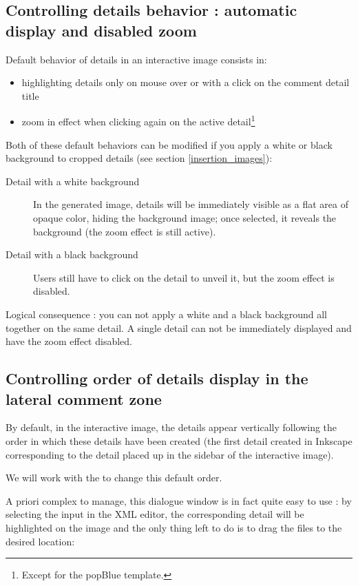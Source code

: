 \subsection{Controlling details behavior : automatic display and disabled zoom}\label{white_black_background}

Default behavior of details in an interactive image consists in:
\begin{itemize}
 \item highlighting details only on mouse over or with a click on the comment 
 detail title
 \item zoom in effect when clicking again on the active detail\footnote{Except 
 for the popBlue template.}
\end{itemize}

Both of these default behaviors can be modified if you apply a white
 or black background to cropped details (see section 
\ref{insertion_images}):
\begin{description}
 \item [Detail with a white background] In the generated image, details will be
 immediately visible as a flat area of opaque color, hiding the background image;  
 once selected, it reveals the background (the zoom effect is still active).
 \item [Detail with a black background] Users still have to click on the detail to unveil it, but the zoom effect is disabled.
\end{description}

Logical consequence : you can not apply a white and a black background all together on the same detail.
A single detail can not be immediately displayed and have the zoom effect disabled.

\subsection{Controlling order of details display in the lateral comment zone}\label{XML_layer}

By default, in the interactive image, the details appear vertically following the order
in which these details have been created (the first detail created in Inkscape corresponding 
to the detail placed up in the sidebar of the interactive image).

We will work with the  to change this default order.

A priori complex to manage, this dialogue window is in fact quite easy to use : 
by selecting the input in the XML editor, the corresponding detail will be
highlighted on the image and the only thing left 
to do is to drag the files to the desired location:\\

